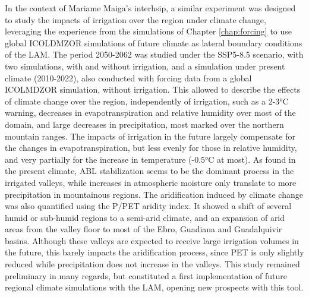 In the context of Mariame Maiga's interhsip, a similar experiment was designed to study the impacts of irrigation over the region under climate change, leveraging the experience from the simulations of Chapter \ref{chap:forcing} to use global ICOLDMZOR simulations of future climate as lateral boundary conditions of the LAM. The period 2050-2062 was studied under the SSP5-8.5 scenario, with two simulations, with and without irrigation, and a simulation under present climate (2010-2022), also conducted with forcing data from a global ICOLMDZOR simulation, without irrigation.
This allowed to describe the effects of climate change over the region, independently of irrigation, such as a 2-3°C warning, decreases in evapotranspiration and relative humidity over most of the domain, and large decreases in precipitation, most marked over the northern mountain ranges. 
The impacts of irrigation in the future largely compensate for the changes in evapotranspiration, but less evenly for those in relative humidity, and very partially for the increase in temperature (-0.5°C at most). As found in the present climate, ABL stabilization seems to be the dominant process in the irrigated valleys, while increases in atmospheric moisture only translate to more precipitation in mountainous regions.
The aridification induced by climate change was also quantified using the P/PET aridity index.
It showed a shift of several humid or sub-humid regions to a semi-arid climate, and an expansion of arid areas from the valley floor to most of the Ebro, Guadiana and Guadalquivir basins. 
Although these valleys are expected to receive large irrigation volumes in the future, this barely impacts the aridification process, since PET is only slightly reduced while precipitation does not increase in the valleys.
This study remained preliminary in many regards, but constituted a first implementation of future regional climate simulations with the LAM, opening new prospects with this tool.

\hfill

